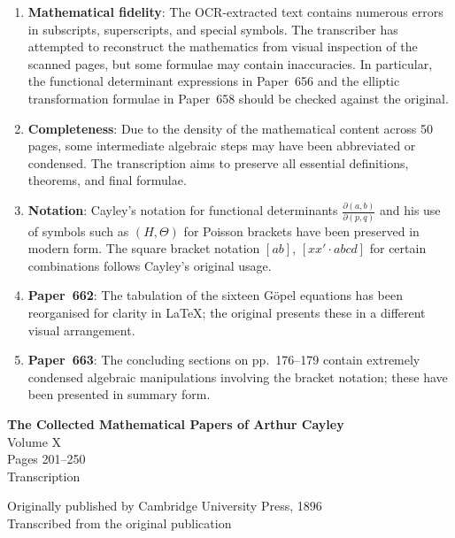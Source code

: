 \documentclass[11pt,a4paper]{book}
\begin{document}
\begin{enumerate}[leftmargin=2em]
\item \textbf{Mathematical fidelity}: The OCR-extracted text contains numerous errors in subscripts, superscripts, and special symbols. The transcriber has attempted to reconstruct the mathematics from visual inspection of the scanned pages, but some formulae may contain inaccuracies. In particular, the functional determinant expressions in Paper~656 and the elliptic transformation formulae in Paper~658 should be checked against the original.

\item \textbf{Completeness}: Due to the density of the mathematical content across 50 pages, some intermediate algebraic steps may have been abbreviated or condensed. The transcription aims to preserve all essential definitions, theorems, and final formulae.

\item \textbf{Notation}: Cayley's notation for functional determinants $\frac{\partial(a, b)}{\partial(p, q)}$ and his use of symbols such as $(H, \Theta)$ for Poisson brackets have been preserved in modern form. The square bracket notation $[ab]$, $[xx' \cdot abcd]$ for certain combinations follows Cayley's original usage.

\item \textbf{Paper~662}: The tabulation of the sixteen G\"{o}pel equations has been reorganised for clarity in \LaTeX; the original presents these in a different visual arrangement.

\item \textbf{Paper~663}: The concluding sections on pp.~176--179 contain extremely condensed algebraic manipulations involving the bracket notation; these have been presented in summary form.
\end{enumerate}
\clearpage


\begin{titlepage}
\centering
\vspace*{2cm}

{\LARGE\bfseries The Collected Mathematical Papers of Arthur Cayley}\\[1cm]
{\Large Volume X}\\[2cm]

{\large Pages 201--250}\\[1cm]

{\large Transcription}\\[2cm]

\vfill

{\small Originally published by Cambridge University Press, 1896}\\[0.5cm]
{\small Transcribed from the original publication}

\vspace{1cm}
\end{titlepage}
\end{document}
